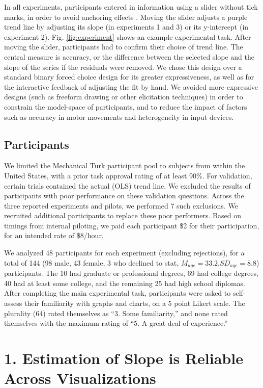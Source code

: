 \documentclass{sigchi}
\begin{document}
In all experiments, participants entered in information using a slider without tick marks, in order to avoid anchoring effects \cite{matejka2016effect}. Moving the slider adjusts a purple trend line by adjusting its slope (in experiments 1 and 3) or its y-intercept (in experiment 2). Fig. \ref{fig:experiment} shows an example experimental task. After moving the slider, participants had to confirm their choice of trend line. The central measure is accuracy, or the difference between the selected slope and the slope of the series if the residuals were removed. We chose this design over a standard binary forced choice design for its greater expressiveness, as well as for the interactive feedback of adjusting the fit by hand. We avoided more expressive designs (such as freeform drawing or other elicitation techniques) in order to constrain the model-space of participants, and to reduce the impact of factors such as accuracy in motor movements and heterogeneity in input devices.

\subsection{Participants}

We limited the Mechanical Turk participant pool to subjects from within the United States, with a prior task approval rating of at least 90\%. For validation, certain trials contained the actual (OLS) trend line. We excluded the results of participants with poor performance on these validation questions. Across the three reported experiments and pilots, we performed 7 such exclusions. We recruited additional participants to replace these poor performers. Based on timings from internal piloting, we paid each participant \$2 for their participation, for an intended rate of \$8/hour. 

We analyzed 48 participants for each experiment (excluding rejections), for a total of 144 (98 male, 43 female, 3 who declined to stat, $M_{age}= 33.2$,$SD_{age}=8.8$) participants. The 10 had graduate or professional degrees, 69 had college degrees, 40 had at least some college, and the remaining 25 had high school diplomas. After completing the main experimental task, participants were asked to self-assess their familiarity with graphs and charts, on a 5 point Likert scale. The plurality (64) rated themselves as ``3. Some familiarity,'' and none rated themselves with the maximum rating of ``5. A great deal of experience.'' 

\section{1. Estimation of Slope is Reliable \\ Across Visualizations}
\end{document}
